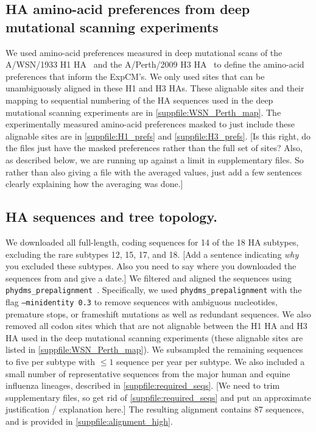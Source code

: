 \documentclass[11pt]{article}
\newcommand\jdbcomment[1]{{\color{red}[#1]}}
\begin{document}
\subsection*{HA amino-acid preferences from deep mutational scanning experiments}
We used amino-acid preferences measured in deep mutational scans of the A/WSN/1933 H1 HA~\citep{doud2016accurate} and the A/Perth/2009 H3 HA~\citep{lee2018deep} to define the amino-acid preferences that inform the ExpCM's. 
We only used sites that can be unambiguously aligned in these H1 and H3 HAs. 
These alignable sites and their mapping to sequential numbering of the HA sequences used in the deep mutational scanning experiments are in \ref{suppfile:WSN_Perth_map}. 
The experimentally measured amino-acid preferences masked to just include these alignable sites are in \ref{suppfile:H1_prefs} and \ref{suppfile:H3_prefs}.
\jdbcomment{Is this right, do the files just have the masked preferences rather than the full set of sites? Also, as described below, we are running up against a limit in supplementary files. So rather than also giving a file with the averaged values, just add a few sentences clearly explaining how the averaging was done.}

\subsection*{HA sequences and tree topology.}

We downloaded all full-length, coding sequences for 14 of the 18 HA subtypes, excluding the rare subtypes 12, 15, 17, and 18.
\jdbcomment{Add a sentence indicating \emph{why} you excluded these subtypes. Also you need to say where you downloaded the sequences from and give a date.} 
We filtered and aligned the sequences using \texttt{phydms\_prepalignment}~\citep{hilton2017phydms}. 
Specifically, we used \texttt{phydms\_prepalignment} with the flag \texttt{--minidentity 0.3} to remove sequences with ambiguous nucleotides, premature stops, or frameshift mutations as well as redundant sequences.  
We also removed all codon sites which that are not alignable between the H1 HA and H3 HA used in the deep mutational scanning experiments (these alignable sites are listed in  \ref{suppfile:WSN_Perth_map}). 
We subsampled the remaining sequences to five per subtype with $\le 1$ sequence per year per subtype. 
We also included a small number of representative sequences from the major human and equine influenza lineages, described in \ref{suppfile:required_seqs}. 
\jdbcomment{We need to trim supplementary files, so get rid of \ref{suppfile:required_seqs} and put an approximate justification / explanation here.}
The resulting alignment contains 87 sequences, and is provided in \ref{suppfile:alignment_high}. 
\end{document}

